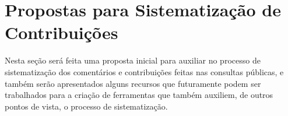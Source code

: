 \section{Propostas para Sistematização de Contribuições}
Nesta seção será feita uma proposta inicial para auxiliar no processo de sistematização dos comentários e contribuições feitas nas consultas públicas, e também serão apresentados alguns recursos que futuramente podem ser trabalhados para a criação de ferramentas que também auxiliem, de outros pontos de vista, o processo de sistematização.



